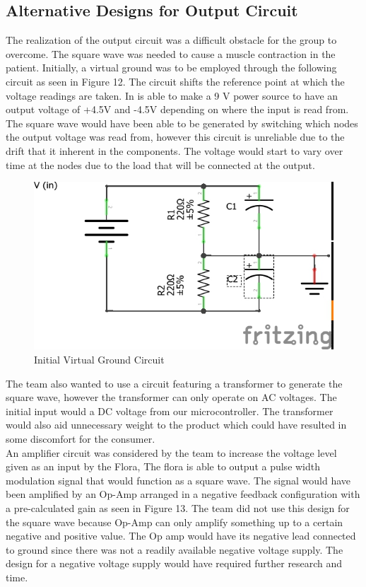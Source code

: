 \documentclass[11.5pt]{article}
\begin{document}
\subsection {Alternative Designs for Output Circuit}
The realization of the output circuit was a difficult obstacle for the group to overcome. The square wave was needed to cause a muscle contraction in the patient. Initially, a virtual ground was to be employed through the following circuit as seen in Figure 12. The circuit shifts the reference point at which the voltage readings are taken. In is able to make a 9 V power source to have an output voltage of +4.5V and -4.5V depending on where the input is read from. The square wave would have been able to be generated by switching which nodes the output voltage was read from, however this circuit is unreliable due to the drift that it inherent in the components. The voltage would start to vary over time at the  nodes due to the load that will be connected at the output. \\

\begin{figure}[H]
    \centering
    \includegraphics[width=0.55\linewidth]{Circuits/Circuit1.jpg}
    \caption{Initial Virtual Ground Circuit}
    \label{fig:PLC}
\end{figure}
\vspace{0.5}

The team also wanted to use a circuit featuring a transformer to generate the square wave, however the transformer can only operate on AC voltages. The initial input would a DC voltage from our microcontroller. The transformer would also aid unnecessary weight to the product which could have resulted in some discomfort for the consumer. \\

An amplifier circuit was considered by the team to increase the voltage level given as an input by the Flora, The flora is able to output a pulse width modulation signal that would function as a square wave. The signal would have been amplified by an Op-Amp arranged in a negative feedback configuration with a pre-calculated gain as seen in Figure 13. The team did not use this design for the square wave because  Op-Amp can only amplify something up to a certain negative and positive value. The Op amp would have its negative lead connected to ground since there was not a readily available negative voltage supply. The design for a negative voltage supply would have required further research and time.  \\
\end{document}
